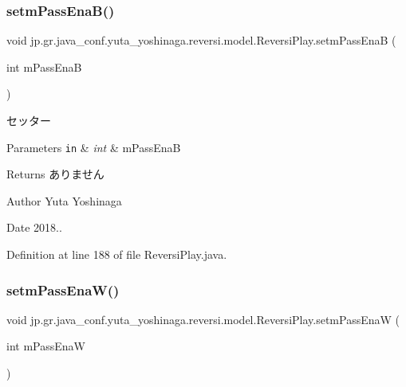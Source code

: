 \subsubsection{\texorpdfstring{setm\+Pass\+Ena\+B()}{setmPassEnaB()}}
{\footnotesize\ttfamily void jp.\+gr.\+java\+\_\+conf.\+yuta\+\_\+yoshinaga.\+reversi.\+model.\+Reversi\+Play.\+setm\+Pass\+EnaB (\begin{DoxyParamCaption}\item[{int}]{m\+Pass\+EnaB }\end{DoxyParamCaption})}



セッター 


\begin{DoxyParams}[1]{Parameters}
\mbox{\tt in}  & {\em int} & m\+Pass\+EnaB \\
\hline
\end{DoxyParams}
\begin{DoxyReturn}{Returns}
ありません 
\end{DoxyReturn}
\begin{DoxyAuthor}{Author}
Yuta Yoshinaga 
\end{DoxyAuthor}
\begin{DoxyDate}{Date}
2018.. 
\end{DoxyDate}


Definition at line 188 of file Reversi\+Play.\+java.

\mbox{\label{classjp_1_1gr_1_1java__conf_1_1yuta__yoshinaga_1_1reversi_1_1model_1_1_reversi_play_abfd46a42f82bd4fd73751d7679427e5e}} 
\subsubsection{\texorpdfstring{setm\+Pass\+Ena\+W()}{setmPassEnaW()}}
{\footnotesize\ttfamily void jp.\+gr.\+java\+\_\+conf.\+yuta\+\_\+yoshinaga.\+reversi.\+model.\+Reversi\+Play.\+setm\+Pass\+EnaW (\begin{DoxyParamCaption}\item[{int}]{m\+Pass\+EnaW }\end{DoxyParamCaption})}



